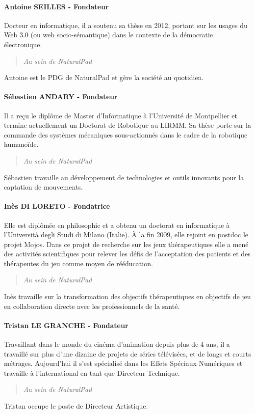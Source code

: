 		\paragraph{Antoine SEILLES - Fondateur\\}
Docteur en informatique, il a soutenu sa thèse en 2012, portant sur les usages du Web 3.0 (ou web socio-sémantique) dans le contexte de la démocratie électronique. 
		\begin{quotation} \emph{Au sein de NaturalPad} \end{quotation}
Antoine est le PDG de NaturalPad et gère la société au quotidien.

		\paragraph{Sébastien ANDARY - Fondateur\\}
Il a reçu le diplôme de Master d’Informatique à l’Université de Montpellier et termine actuellement un Doctorat de Robotique au LIRMM. Sa thèse porte sur la commande des systèmes mécaniques sous-actionnés dans le cadre de la robotique humanoïde. 
		\begin{quotation} \emph{Au sein de NaturalPad} \end{quotation}
Sébastien travaille au développement de technologies et outils innovants pour la captation de mouvements.

		\paragraph{Inès DI LORETO - Fondatrice\\}
Elle est diplômée en philosophie et a obtenu un doctorat en informatique à l’Università degli Studi di Milano (Italie). À la fin 2009, elle rejoint en postdoc le projet Mojos. Dans ce projet de recherche sur les jeux thérapeutiques elle a mené des activités scientifiques pour relever les défis de l’acceptation des patients et des thérapeutes du jeu comme moyen de rééducation. 
		\begin{quotation} \emph{Au sein de NaturalPad} \end{quotation}
Inès travaille sur la transformation des objectifs thérapeutiques en objectifs de jeu en collaboration directe avec les professionnels de la santé.

		\paragraph{Tristan LE GRANCHE - Fondateur\\}
Travaillant dans le monde du cinéma d’animation depuis plus de 4 ans, il a travaillé sur plus d’une dizaine de projets de séries télévisées, et de longs et courts métrages. Aujourd’hui il s’est spécialisé dans les Effets Spéciaux Numériques et travaille à l’international en tant que Directeur Technique.
		\begin{quotation} \emph{Au sein de NaturalPad} \end{quotation}
Tristan occupe le poste de Directeur Artistique.
	
